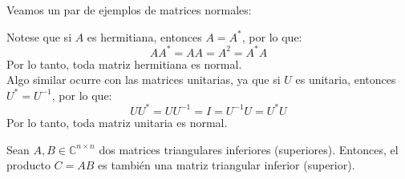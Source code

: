 Veamos un par de ejemplos de matrices normales:

\begin{observación}
    Notese que si $A$ es hermitiana, entonces $A = A^*$, por lo que:
    \[
        A A^* = A A = A^2 = A^* A
    \]
    Por lo tanto, toda matriz hermitiana es normal.\\
    Algo similar ocurre con las matrices unitarias, ya que si $U$ es unitaria, entonces $U^* = U^{-1}$, por lo que:
    \[
        U U^* = U U^{-1} = I = U^{-1} U = U^* U
    \]
    Por lo tanto, toda matriz unitaria es normal.
\end{observación}

\begin{proposición}
    Sean $A, B \in \mathbb{C}^{n \times n}$ dos matrices triangulares inferiores (superiores). Entonces, el producto \( C = AB \) es también una matriz triangular inferior (superior).
\end{proposición}

